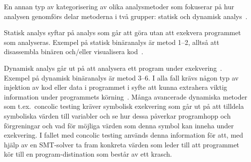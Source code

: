 En annan typ av kategorisering av olika analysmetoder som fokuserar på hur
analysen genomförs delar metoderna i två grupper: statisk och dynamisk
analys~\cite{dynamic_bin_analysis}.

Statisk analys syftar på analys som går att göra utan att exekvera programmet
som analyseras. Exempel på statisk binäranalys är metod 1--2, alltså att
disassembla binären och/eller visualisera kod~\cite{dynamic_bin_analysis}.

Dynamisk analys går ut på att analysera ett program under
exekvering~\cite{dynamic_bin_analysis}. Exempel på dynamisk binäranalys är
metod 3--6. I alla fall krävs någon typ av injektion av kod eller data i
programmet i syfte att kunna extrahera viktig information under programmets
körning~\cite{dynamic_bin_analysis}. Många avancerade dynamiska metoder som
t.ex.\ concolic testing kräver symbolisk exekvering som går ut på att tilldela
symboliska värden till variabler och se hur dessa påverkar programhopp och
förgreningar och vad för möjliga värden som denna symbol kan inneha under
exekvering. I fallet med concolic testing används denna information för att,
med hjälp av en SMT-solver ta fram konkreta värden som leder till att
programmet kör till en program-distination som består av ett krasch.
